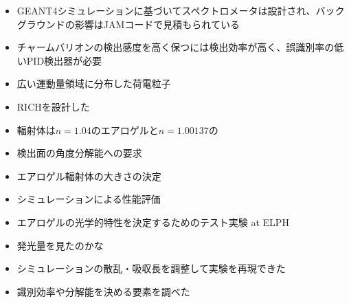 \documentclass[../main.tex]{subfiles}
\begin{document}
\begin{tcolorbox}[
  title=過去の修論の切り口,
  colback=yellow!8,
  colframe=black!30,
  breakable
]
\begin{itemize}
\begin{itemize}
    \item GEANT4シミュレーションに基づいてスペクトロメータは設計され、バックグラウンドの影響はJAMコードで見積もられている
    \item チャームバリオンの検出感度を高く保つには検出効率が高く、誤識別率の低いPID検出器が必要
    \item 広い運動量領域に分布した荷電粒子
    \item RICHを設計した
    \item 輻射体は$n=1.04$のエアロゲルと$n=1.00137$の
    \item 検出面の角度分解能への要求
    \item エアロゲル輻射体の大きさの決定
    \item シミュレーションによる性能評価
    \item エアロゲルの光学的特性を決定するためのテスト実験 at ELPH
    \item 発光量を見たのかな
    \item シミュレーションの散乱・吸収長を調整して実験を再現できた
    \item 識別効率や分解能を決める要素を調べた
  \end{itemize}
\end{itemize}
\end{tcolorbox}
\end{document}
